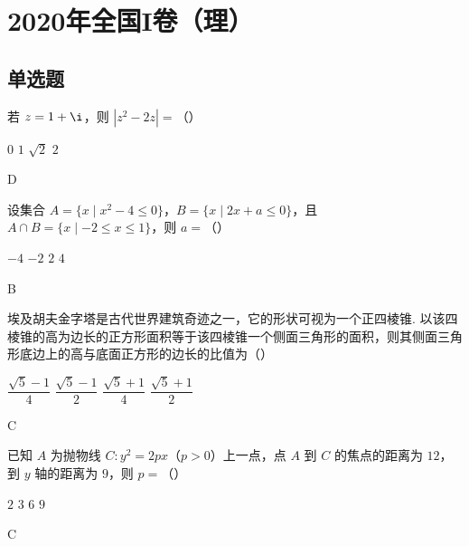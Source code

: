 \chapter{2020年全国I卷（理）}

\section{单选题}

\begin{problem}
若 \(z=1+\i\)，则 \(\left\lvert z^2-2z \right\rvert=\)（\quad）

\choices
    {\(0\)}
    {\(1\)}
    {\(\sqrt{2}\)}
    {\(2\)}

\begin{answer}
D
\end{answer}
\end{problem}

\begin{problem}
设集合 \(A=\{x\mid x^2-4\le 0\}\)，\(B=\{x\mid 2x+a\le 0\}\)，且 \(A\cap B=\{x\mid -2\le x\le 1\}\)，则 \(a=\)（\quad）

\choices
    {\(-4\)}
    {\(-2\)}
    {\(2\)}
    {\(4\)}

\begin{answer}
B
\end{answer}
\end{problem}

\begin{problem}
埃及胡夫金字塔是古代世界建筑奇迹之一，它的形状可视为一个正四棱锥. 以该四棱锥的高为边长的正方形面积等于该四棱锥一个侧面三角形的面积，则其侧面三角形底边上的高与底面正方形的边长的比值为（\quad）


\choices
    {\(\dfrac{\sqrt{5}-1}{4}\)}
    {\(\dfrac{\sqrt{5}-1}{2}\)}
    {\(\dfrac{\sqrt{5}+1}{4}\)}
    {\(\dfrac{\sqrt{5}+1}{2}\)}

\begin{answer}
C
\end{answer}
\end{problem}

\begin{problem}
已知 \(A\) 为抛物线 \(C:y^2=2px\)（\(p>0\)）上一点，点 \(A\) 到 \(C\) 的焦点的距离为 \(12\)，到 \(y\) 轴的距离为 \(9\)，则 \(p=\)（\quad）

\choices
    {\(2\)}
    {\(3\)}
    {\(6\)}
    {\(9\)}

\begin{answer}
C
\end{answer}
\end{problem}

